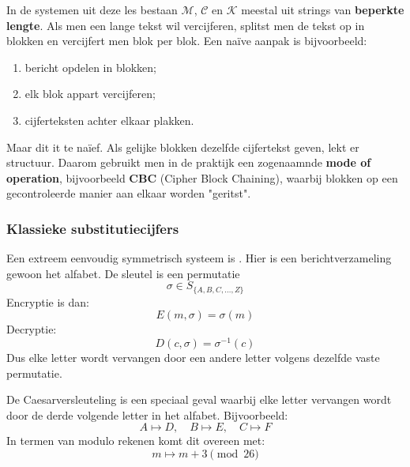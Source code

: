 In de systemen uit deze les bestaan $\mathcal{M}$, $\mathcal{C}$ en $\mathcal{K}$ meestal uit strings van \textbf{beperkte lengte}. Als men een lange tekst wil vercijferen, splitst men de tekst op in blokken en vercijfert men blok per blok. Een naïve aanpak is bijvoorbeeld:
\begin{enumerate}
    \item bericht opdelen in blokken;
    \item elk blok appart vercijferen;
    \item cijferteksten achter elkaar plakken.
\end{enumerate}
Maar dit it te naïef. Als gelijke blokken dezelfde cijfertekst geven, lekt er structuur. Daarom gebruikt men in de praktijk een zogenaamnde \textbf{mode of operation}, bijvoorbeeld \textbf{CBC} (Cipher Block Chaining), waarbij blokken op een gecontroleerde manier aan elkaar worden "geritst".

\subsubsection{Klassieke substitutiecijfers}


Een extreem eenvoudig symmetrisch systeem is . Hier is een berichtverzameling gewoon het alfabet. De sleutel is een permutatie
\begin{equation*}
    \sigma \in S_{\{A, B, C, \dots, Z\}}
\end{equation*}
Encryptie is dan:
\begin{equation*}
    E(m, \sigma) = \sigma (m)
\end{equation*}
Decryptie:
\begin{equation*}
    D(c, \sigma) = \sigma^{-1}(c)
\end{equation*}
Dus elke letter wordt vervangen door een andere letter volgens dezelfde vaste permutatie.


De Caesarversleuteling is een speciaal geval waarbij elke letter vervangen wordt door de derde volgende letter in het alfabet. Bijvoorbeeld:
\begin{equation*}
    A \mapsto D, \quad B \mapsto E, \quad C \mapsto F
\end{equation*}
In termen van modulo rekenen komt dit overeen met:
\begin{equation*}
    m \mapsto m + 3 \pmod {26}
\end{equation*}

